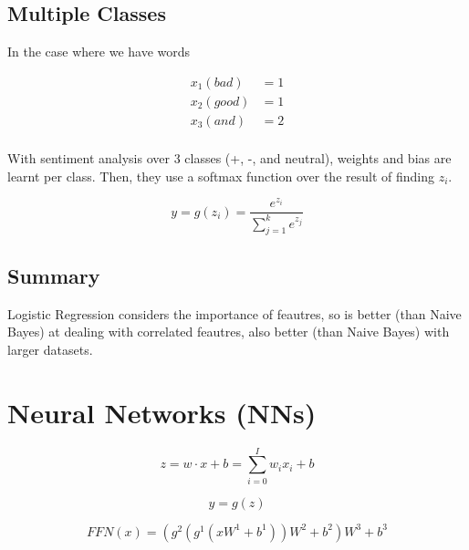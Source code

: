 \documentclass[11pt]{article}
\begin{document}
\subsection{Multiple Classes}

In the case where we have words

\begin{align*}
    x_1 (bad) & = 1 \\
    x_2 (good) & = 1 \\
    x_3 (and) & = 2 \\
\end{align*}

With sentiment analysis over 3 classes (+, -, and neutral), weights and bias are learnt per class. Then, they use a softmax function over the result of finding $z_i$.

\begin{equation*}
    y=g(z_i)=\frac{e^{z_i}}{\sum^k_{j=1}e^{z_j}}
\end{equation*}

\subsection{Summary}

Logistic Regression considers the importance of feautres, so is better (than Naive Bayes) at dealing with correlated feautres, also better (than Naive Bayes) with larger datasets.

\section{Neural Networks (NNs)}

\begin{definition}
    \begin{equation*}
        z = w \cdot x + b = \sum^I_{i=0}w_ix_i + b
    \end{equation*}
\end{definition}

\begin{definition}
    \begin{equation*}
        y = g(z)
    \end{equation*}
\end{definition}

\begin{definition}
    \begin{equation*}
        FFN(x) = (g^2(g^1(xW^1+b^1))W^2 + b^2)W^3 + b^3
    \end{equation*}
\end{definition}
\end{document}
